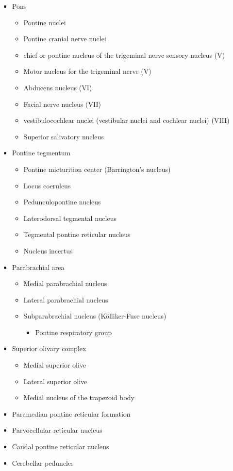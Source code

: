 \begin{itemize}
\tightlist
\item
  Pons

  \begin{itemize}
  \tightlist
  \item
    Pontine nuclei
  \item
    Pontine cranial nerve nuclei
  \item
    chief or pontine nucleus of the trigeminal nerve sensory nucleus (V)
  \item
    Motor nucleus for the trigeminal nerve (V)
  \item
    Abducens nucleus (VI)
  \item
    Facial nerve nucleus (VII)
  \item
    vestibulocochlear nuclei (vestibular nuclei and cochlear nuclei) (VIII)
  \item
    Superior salivatory nucleus
  \end{itemize}
\item
  Pontine tegmentum

  \begin{itemize}
  \tightlist
  \item
    Pontine micturition center (Barrington's nucleus)
  \item
    Locus coeruleus
  \item
    Pedunculopontine nucleus
  \item
    Laterodorsal tegmental nucleus
  \item
    Tegmental pontine reticular nucleus
  \item
    Nucleus incertus
  \end{itemize}
\item
  Parabrachial area

  \begin{itemize}
  \tightlist
  \item
    Medial parabrachial nucleus
  \item
    Lateral parabrachial nucleus
  \item
    Subparabrachial nucleus (Kölliker-Fuse nucleus)

    \begin{itemize}
    \tightlist
    \item
      Pontine respiratory group
    \end{itemize}
  \end{itemize}
\item
  Superior olivary complex

  \begin{itemize}
  \tightlist
  \item
    Medial superior olive
  \item
    Lateral superior olive
  \item
    Medial nucleus of the trapezoid body
  \end{itemize}
\item
  Paramedian pontine reticular formation
\item
  Parvocellular reticular nucleus
\item
  Caudal pontine reticular nucleus
\item
  Cerebellar peduncles


\end{itemize}
